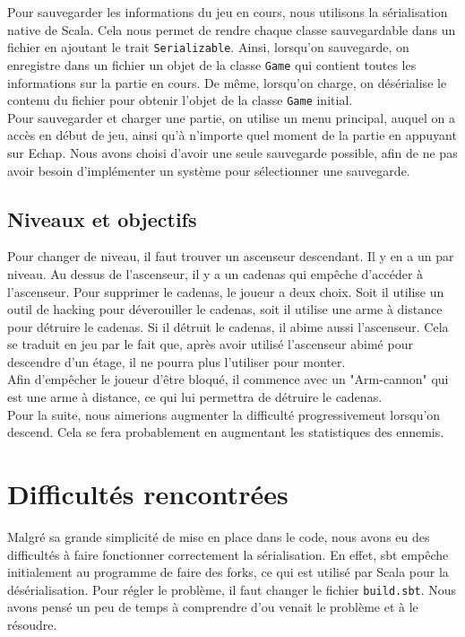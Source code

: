 \documentclass[10pt,a4paper]{article}
\begin{document}
Pour sauvegarder les informations du jeu en cours, nous utilisons la sérialisation native de Scala. Cela nous permet de rendre chaque classe sauvegardable dans un fichier en ajoutant le trait \texttt{Serializable}. Ainsi, lorsqu'on sauvegarde, on enregistre dans un fichier un objet de la classe \texttt{Game} qui contient toutes les informations sur la partie en cours. De même, lorsqu'on charge, on désérialise le contenu du fichier pour obtenir l'objet de la classe \texttt{Game} initial.\\
Pour sauvegarder et charger une partie, on utilise un menu principal, auquel on a accès en début de jeu, ainsi qu'à n'importe quel moment de la partie en appuyant sur Echap. Nous avons choisi d'avoir une seule sauvegarde possible, afin de ne pas avoir besoin d'implémenter un système pour sélectionner une sauvegarde.\\

\subsection{Niveaux et objectifs}

Pour changer de niveau, il faut trouver un ascenseur descendant. Il y en a un par niveau. Au dessus de l'ascenseur, il y a un cadenas qui empêche d'accéder à l'ascenseur. Pour supprimer le cadenas, le joueur a deux choix. Soit il utilise un outil de hacking pour déverouiller le cadenas, soit il utilise une arme à distance pour détruire le cadenas. Si il détruit le cadenas, il abime aussi l'ascenseur. Cela se traduit en jeu par le fait que, après avoir utilisé l'ascenseur abimé pour descendre d'un étage, il ne pourra plus l'utiliser pour monter.\\
Afin d'emp\^echer le joueur d'\^etre bloqué, il commence avec un "Arm-cannon" qui est une arme à distance, ce qui lui permettra de détruire le cadenas.\\
Pour la suite, nous aimerions augmenter la difficulté progressivement lorsqu'on descend. Cela se fera probablement en augmentant les statistiques des ennemis.

\section{Difficultés rencontrées}

Malgré sa grande simplicité de mise en place dans le code, nous avons eu des difficultés à faire fonctionner correctement la sérialisation. En effet, sbt empêche initialement au programme de faire des forks, ce qui est utilisé par Scala pour la désérialisation. Pour régler le problème, il faut changer le fichier \texttt{build.sbt}. Nous avons pensé un peu de temps à comprendre d'ou venait le problème et à le résoudre.\\
\end{document}
